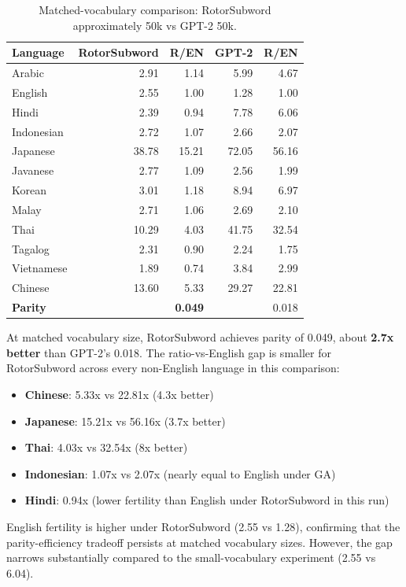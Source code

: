 \documentclass[11pt]{article}
\begin{document}
\begin{table}[htbp]
\centering
\caption{Matched-vocabulary comparison: RotorSubword approximately 50k vs GPT-2 50k.}
\label{tab:matched}
\begin{tabular}{lrrrr}
\toprule
Language & RotorSubword & R/EN & GPT-2 & R/EN \\
\midrule
Arabic & 2.91 & 1.14 & 5.99 & 4.67 \\
English & 2.55 & 1.00 & 1.28 & 1.00 \\
Hindi & 2.39 & 0.94 & 7.78 & 6.06 \\
Indonesian & 2.72 & 1.07 & 2.66 & 2.07 \\
Japanese & 38.78 & 15.21 & 72.05 & 56.16 \\
Javanese & 2.77 & 1.09 & 2.56 & 1.99 \\
Korean & 3.01 & 1.18 & 8.94 & 6.97 \\
Malay & 2.71 & 1.06 & 2.69 & 2.10 \\
Thai & 10.29 & 4.03 & 41.75 & 32.54 \\
Tagalog & 2.31 & 0.90 & 2.24 & 1.75 \\
Vietnamese & 1.89 & 0.74 & 3.84 & 2.99 \\
Chinese & 13.60 & 5.33 & 29.27 & 22.81 \\
\textbf{Parity} & & \textbf{0.049} & & 0.018 \\
\bottomrule
\end{tabular}
\end{table}

At matched vocabulary size, RotorSubword achieves parity of 0.049, about \textbf{2.7x better} than GPT-2's 0.018. The ratio-vs-English gap is smaller for RotorSubword across every non-English language in this comparison:
\begin{itemize}
  \item \textbf{Chinese}: 5.33x vs 22.81x (4.3x better)
  \item \textbf{Japanese}: 15.21x vs 56.16x (3.7x better)
  \item \textbf{Thai}: 4.03x vs 32.54x (8x better)
  \item \textbf{Indonesian}: 1.07x vs 2.07x (nearly equal to English under GA)
  \item \textbf{Hindi}: 0.94x (lower fertility than English under RotorSubword in this run)
\end{itemize}

English fertility is higher under RotorSubword (2.55 vs 1.28), confirming that the parity-efficiency tradeoff persists at matched vocabulary sizes. However, the gap narrows substantially compared to the small-vocabulary experiment (2.55 vs 6.04).
\end{document}
